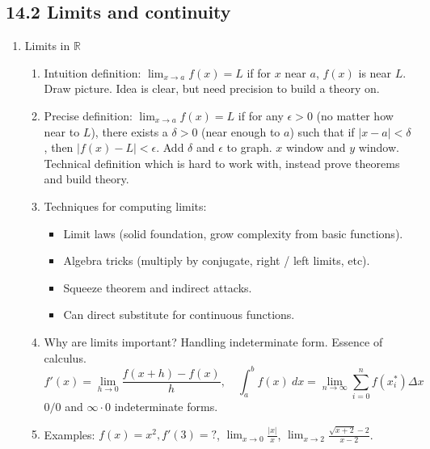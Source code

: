 \documentclass{article}
\newcommand{\ds}{\displaystyle}
\begin{document}
\subsection{14.2 Limits and continuity}
\begin{enumerate}
\item Limits in $\mathbb{R}$
\begin{enumerate}
\item Intuition definition: $\ds \lim_{x\rightarrow a} f(x) = L$ if for $x$ near $a$, $f(x)$ is near $L$. Draw picture. Idea is clear, but need precision to build a theory on. 
\item Precise definition: $\ds \lim_{x\rightarrow a} f(x) = L$ if for any $\epsilon > 0$ (no matter how near to $L$), there exists a $\delta >0$ (near enough to $a$) such that if $|x-a| < \delta$, then $|f(x)-L| < \epsilon$. Add $\delta$ and $\epsilon$ to graph. $x$ window and $y$ window. Technical definition which is hard to work with, instead prove theorems and build theory.
\item Techniques for computing limits:
\begin{itemize}
\item Limit laws (solid foundation, grow complexity from basic functions).
\item Algebra tricks (multiply by conjugate, right / left limits, etc).
\item Squeeze theorem and indirect attacks.
\item Can direct substitute for continuous functions.
\end{itemize}
\item Why are limits important? Handling indeterminate form. Essence of calculus.
\[
f'(x) = \lim_{h \rightarrow 0} \frac{f(x+h)-f(x)}{h}, \quad \int_a^b f(x)~dx = \lim_{n\rightarrow \infty} \sum_{i=0}^n f(x_i^*)\Delta x
\]
$0/0$ and $\infty \cdot 0$ indeterminate forms.
\item Examples: $f(x)=x^2, f'(3)=?$, $\lim_{x \rightarrow 0} \frac{|x|}{x}$, $\lim_{x \rightarrow 2} \frac{\sqrt{x+2}-2}{x-2}$.
\end{enumerate}


\end{enumerate}
\end{document}
